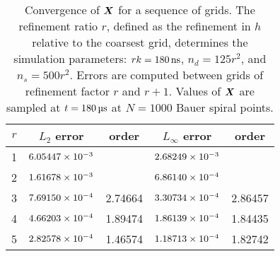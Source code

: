 \begin{table}[tbp]
    \centering
    \caption[Convergence of surface positions for relaxing RBC test]{%
Convergence of $\boldsymbol{X}$ for a sequence of grids. The refinement ratio $r$, defined as the
refinement in $h$ relative to the coarsest grid, determines the simulation parameters:
$r\timestep = 180\ns$, $n_d = 125r^2$, and $n_s = 500r^2$. Errors are computed between
grids of refinement factor $r$ and $r+1$. Values of $\boldsymbol{X}$ are sampled at $t = 180\us$ at
$N=1000$ Bauer spiral points.
    }\label{tab:x-rbc-conv}
    \begingroup
    \setlength{\tabcolsep}{9pt}
    \renewcommand{\arraystretch}{1.5}
    \begin{tabular}{c|cc|cc}
                                                                                     \toprule
        $r$ & $L_2$ error            & order   & $L_\infty$ error       & order   \\ \midrule
        1   & ${6.05447}\times 10^{-3}$ &         & ${2.68249}\times 10^{-3}$ &         \\
        2   & ${1.61678}\times 10^{-3}$ &         & ${6.86140}\times 10^{-4}$ &         \\
        3   & ${7.69150}\times 10^{-4}$ & 2.74664 & ${3.30734}\times 10^{-4}$ & 2.86457 \\
        4   & ${4.66203}\times 10^{-4}$ & 1.89474 & ${1.86139}\times 10^{-4}$ & 1.84435 \\
        5   & ${2.82578}\times 10^{-4}$ & 1.46574 & ${1.18713}\times 10^{-4}$ & 1.82742 \\ \bottomrule
    \end{tabular}
    \endgroup
\end{table}

